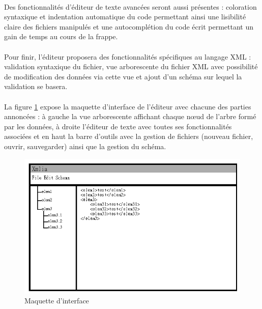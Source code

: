 \paragraph{}
Des fonctionnalités d'éditeur de texte avancées seront aussi présentes : coloration syntaxique et indentation automatique du code permettant ainsi une lisibilité claire des fichiers manipulés et une autocomplétion du code écrit permettant un gain de temps au cours de la frappe.
\paragraph{}
Pour finir, l'éditeur proposera des fonctionnalités spécifiques au langage XML : validation syntaxique du fichier, vue arborescente du fichier XML avec possibilité de modification des données via cette vue et ajout d'un schéma sur lequel la validation se basera.
\paragraph{}	
La figure \ref{maquette_interface} expose la maquette d'interface de l'éditeur avec chacune des parties annoncées : à gauche la vue arborescente affichant chaque nœud de l'arbre formé par les données, à droite l'éditeur de texte avec toutes ses fonctionnalités associées et en haut la barre d'outils avec la gestion de fichiers (nouveau fichier, ouvrir, sauvegarder) ainsi que la gestion du schéma.

\begin{figure}[h!]
\begin{minipage}[b]{\linewidth}
\centering \includegraphics[scale=0.5]{images/analyse-maquette.png}
\caption{Maquette d'interface}
\label{maquette_interface}
\end{minipage}
\end{figure}
	
